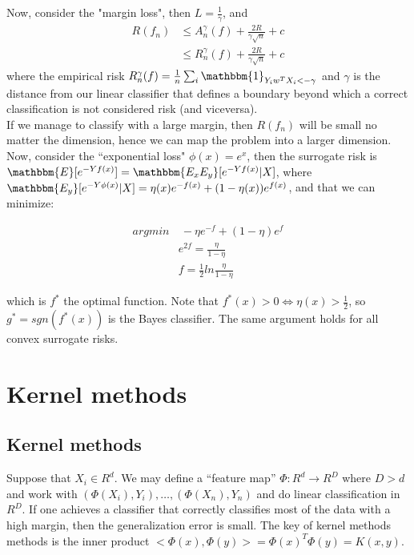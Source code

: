 \documentclass[11pt, english]{article}
\begin{document}
Now, consider the "margin loss", then $L = \frac{1}{\gamma}$, and
\begin{align*}
	 R(f_n) &\leq A_n^{\gamma}(f) + \frac{2R}{\gamma\sqrt{n}} + c\\
	 &\leq R_n^{\gamma}(f) + \frac{2R}{\gamma\sqrt{n}} + c
\end{align*}
where the empirical risk $R_n^{\gamma}(f) = \frac{1}{n} \sum_i \mathbbm{1}_{Y_iw^TX_i < -\gamma}$ and $\gamma$ is the distance from our linear classifier that defines a boundary beyond which a correct classification is not considered risk (and viceversa).\\ %
If we manage to classify with a large margin, then $R(f_n)$ will be small no matter the dimension, hence we can map the problem into a larger dimension.\\
 
Now, consider the ``exponential loss" $\phi(x) = e^x$, then the surrogate risk is $\mathbbm{E}[e^{-Yf(x)}] = \mathbbm{E_xE_y}[e^{-Yf(x)}|X]$, where $\mathbbm{E_y}[e^{-Y\phi(x)}|X] = \eta(x) e^{-f(x)} + (1-\eta(x))e^{f(x)}$, and that we can minimize: %
 
\begin{align}%
	 arg min &\ -\eta e^{-f} + (1-\eta)e^f\\
	 & e^{2f} = \frac{\eta}{1 - \eta}\\
	 & f = \frac{1}{2} ln \frac{\eta}{1 - \eta}
\end{align}

which is $f^*$ the optimal function. Note that $f^*(x)>0 \Leftrightarrow \eta(x)>\frac{1}{2}$, so $g^* = sgn(f^*(x))$ is the Bayes classifier. The same argument holds for all convex surrogate risks.
 

\section{Kernel methods}


\subsection{Kernel methods}%


Suppose that $X_i \in R^d$. We may define a ``feature map'' $\Phi : R^d \rightarrow R^D$ where $ D>d$ and work with $(\Phi(X_i), Y_i), \dots, (\Phi(X_n), Y_n)$ and do linear classification in $R^D$. If one achieves a classifier that correctly classifies most of the data with a high margin, then the generalization error is small. The key of kernel methods methods is the inner product $<\Phi(x), \Phi(y)> = \Phi(x)^T \Phi(y) = K(x,y)$.\\
\end{document}
